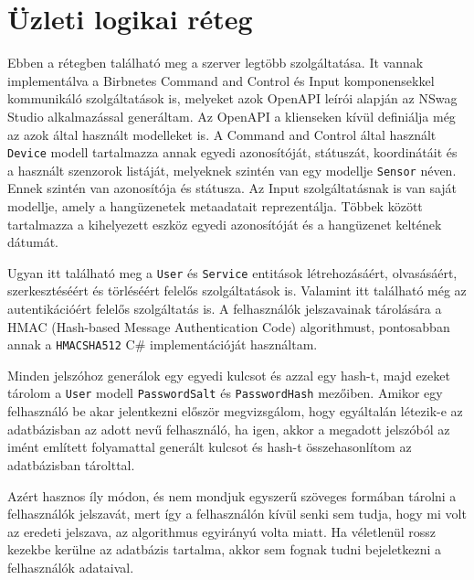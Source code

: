 \section{Üzleti logikai réteg}
Ebben a rétegben található meg a szerver legtöbb szolgáltatása. It vannak implementálva a Birbnetes Command and Control és Input komponensekkel kommunikáló szolgáltatások is, 
melyeket azok OpenAPI leírói alapján az NSwag Studio \cite{nswag-studio} alkalmazással generáltam. Az OpenAPI a klienseken kívül definiálja még az azok által használt modelleket is.
A Command and Control által használt \verb+Device+ modell tartalmazza annak egyedi azonosítóját, státuszát, koordinátáit és a használt szenzorok listáját, 
melyeknek szintén van egy modellje \verb+Sensor+ néven. Ennek szintén van azonosítója és státusza. Az Input szolgáltatásnak is van saját modellje, 
amely a hangüzenetek metaadatait reprezentálja. Többek között tartalmazza a kihelyezett eszköz egyedi azonosítóját és a hangüzenet keltének dátumát. 

Ugyan itt található meg a \verb+User+ és \verb+Service+ entitások létrehozásáért, olvasásáért, szerkesztéséért és törléséért felelős szolgáltatások is.
Valamint itt található még az autentikációért felelős szolgáltatás is. A felhasználók jelszavainak tárolására a HMAC (Hash-based Message Authentication Code) algorithmust, 
pontosabban annak a \verb+HMACSHA512+ \cite{hmacsha512} C\# implementációját használtam. 

Minden jelszóhoz generálok egy egyedi kulcsot és azzal egy hash-t, majd ezeket tárolom a \verb+User+ modell \verb+PasswordSalt+ és \verb+PasswordHash+ mezőiben.
Amikor egy felhasználó be akar jelentkezni először megvizsgálom, hogy egyáltalán létezik-e az adatbázisban az adott nevű felhasználó, 
ha igen, akkor a megadott jelszóból az imént említett folyamattal generált kulcsot és hash-t összehasonlítom az adatbázisban tárolttal.

Azért hasznos íly módon, és nem mondjuk egyszerű szöveges formában tárolni a felhasználók jelszavát, mert így a felhasználón kívül senki sem tudja, hogy mi volt az eredeti jelszava,
az algorithmus egyirányú volta miatt\footnotemark. Ha véletlenül rossz kezekbe kerülne az adatbázis tartalma, akkor sem fognak tudni bejeletkezni a felhasználók adataival.

